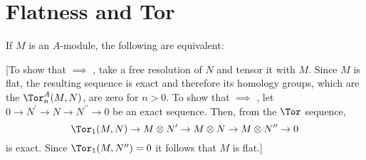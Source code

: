 \section{Flatness and Tor}

\begin{exercise}
If \(M\) is an \(A\)-module, the following are equivalent:
[To show that  \(\implies\) , take a free resolution of \(N\) and tensor it with \(M\).
Since \(M\) is flat, the resulting sequence is exact and therefore its homology groups, which are the \(\Tor_n^A(M, N)\), are zero for \(n > 0\).
To show that  \(\implies\) , let \(0 \to N^\prime \to N \to N^{\prime\prime} \to 0\) be an exact sequence.
Then, from the \(\Tor\) sequence,
\begin{equation*}
\Tor_1(M, N) \to M \otimes N^\prime \to M \otimes N \to M \otimes N^{\prime\prime} \to 0
\end{equation*}
is exact.
Since \(\Tor_1(M, N^{\prime\prime}) = 0\) it follows that \(M\) is flat.]
\end{exercise}